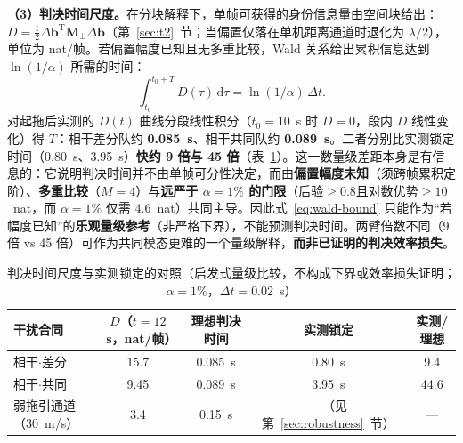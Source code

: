 \documentclass[UTF8,a4paper,zihao=-4]{ctexart}
\begin{document}
\noindent\textbf{（3）判决时间尺度。}\quad 在分块解释下，单帧可获得的身份信息量由空间块给出：\(D=\tfrac12\Delta\boldsymbol b^{\mathrm T}\boldsymbol M_\perp\Delta\boldsymbol b\)（第~\ref{sec:t2}~节；当偏置仅落在单机距离通道时退化为 \(\lambda/2\)），单位为 nat/帧。若偏置幅度已知且无多重比较，Wald 关系给出累积信息达到 \(\ln(1/\alpha)\) 所需的时间：
\begin{equation}
\int_{t_0}^{t_0+T}D(\tau)\,\mathrm d\tau=\ln(1/\alpha)\,\Delta t .
\label{eq:wald-bound}
\end{equation}
对起拖后实测的 \(D(t)\) 曲线分段线性积分（\(t_0=10\)~s 时 \(D=0\)，段内 \(D\) 线性变化）得 \(T\)：相干差分队约 \textbf{0.085~s}、相干共同队约 \textbf{0.089~s}。二者分别比实测锁定时间（0.80~s、3.95~s）\textbf{快约 9 倍与 45 倍}（表~\ref{tab:wald}）。这一数量级差距本身是有信息的：它说明判决时间并不由单帧可分性决定，而由\textbf{偏置幅度未知}（须跨帧累积定阶）、\textbf{多重比较}（\(M=4\)）与\textbf{远严于 \(\alpha=1\%\) 的门限}（后验\(\ge0.8\)且对数优势\(\ge10\)~nat，而 \(\alpha=1\%\) 仅需 4.6~nat）共同主导。因此式~\eqref{eq:wald-bound} 只能作为“若幅度已知”的\textbf{乐观量级参考}（非严格下界），不能预测判决时间。两臂倍数不同（9 倍 vs 45 倍）可作为共同模态更难的一个量级解释，\textbf{而非已证明的判决效率损失}。

\begin{table}[H]
\centering
\caption{判决时间尺度与实测锁定的对照（启发式量级比较，不构成下界或效率损失证明；\(\alpha=1\%\)，\(\Delta t=0.02\)~s）}
\label{tab:wald}
\small
\begin{tabular}{@{}lcccc@{}}
\toprule
干扰合同 & \(D\)（\(t=12\)~s，nat/帧） & 理想判决时间 & 实测锁定 & 实测/理想 \\
\midrule
相干\(\cdot\)差分 & 15.7 & 0.085~s & 0.80~s & 9.4 \\
相干\(\cdot\)共同 & 9.45 & 0.089~s & 3.95~s & 44.6 \\
弱拖引通道（\(30\)~m/s） & 3.4 & 0.15~s & —（见第~\ref{sec:robustness}~节） & — \\
\bottomrule
\end{tabular}
\par{}
\end{table}
\end{document}
